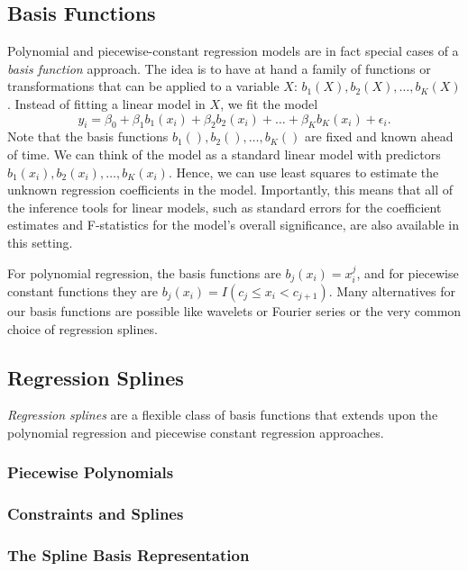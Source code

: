 \documentclass{article}
\numberwithin{equation}{section}
\begin{document}
\begin{enumerate}
\subsection{Basis Functions}
Polynomial and piecewise-constant regression models are in fact special cases of a \textit{basis function} approach. The idea is to have at hand a family of functions or transformations that can be applied to a variable $X$: $b_1(X), b_2(X),\dots, b_K(X)$. Instead of fitting a linear model in $X$, we fit the model
\begin{equation}
    y_i = \beta_0 + \beta_1b_1(x_i) + \beta_2b_2(x_i) + \dots + \beta_Kb_K(x_i) + \epsilon_i.
\end{equation}
Note that the basis functions $b_1(), b_2(),\dots,b_K()$ are fixed and known ahead of time. We can think of the model as a standard linear model with predictors $b_1(x_i), b_2(x_i),\dots, b_K(x_i)$. Hence, we can use least squares to estimate the unknown regression coefficients in the model. Importantly, this means that all of the inference tools for linear models, such as standard errors for the coefficient estimates and F-statistics for the model’s overall significance, are also available in this setting.

For polynomial regression, the basis functions are $b_j(x_i) = x_i^j$, and for piecewise constant functions they are $b_j (x_i) = I(c_j \leq x_i < c_{j+1})$. Many alternatives for our basis functions are possible like wavelets or Fourier series or the very common choice of regression splines.

\subsection{Regression Splines}
\textit{Regression splines} are a flexible class of basis functions that extends upon the polynomial regression and piecewise constant regression approaches.

\subsubsection{Piecewise Polynomials}

\subsubsection{Constraints and Splines}
\subsubsection{The Spline Basis Representation}

\end{enumerate}
\end{document}
